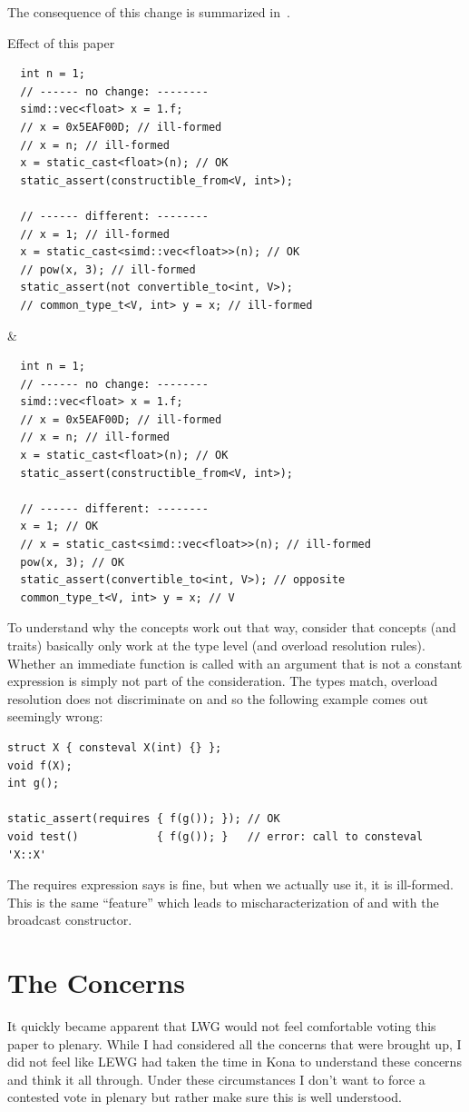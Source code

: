The consequence of this change is summarized in~.
\begin{tonytable}{Effect of this paper}\label{tt:effect}
  \begin{lstlisting}
  int n = 1;
  // ------ no change: --------
  simd::vec<float> x = 1.f;
  // x = 0x5EAF00D; // ill-formed
  // x = n; // ill-formed
  x = static_cast<float>(n); // OK
  static_assert(constructible_from<V, int>);

  // ------ different: --------
  // x = 1; // ill-formed
  x = static_cast<simd::vec<float>>(n); // OK
  // pow(x, 3); // ill-formed
  static_assert(not convertible_to<int, V>);
  // common_type_t<V, int> y = x; // ill-formed
  \end{lstlisting}
  &
  \begin{lstlisting}
  int n = 1;
  // ------ no change: --------
  simd::vec<float> x = 1.f;
  // x = 0x5EAF00D; // ill-formed
  // x = n; // ill-formed
  x = static_cast<float>(n); // OK
  static_assert(constructible_from<V, int>);

  // ------ different: --------
  x = 1; // OK
  // x = static_cast<simd::vec<float>>(n); // ill-formed
  pow(x, 3); // OK
  static_assert(convertible_to<int, V>); // opposite
  common_type_t<V, int> y = x; // V
  \end{lstlisting}
\end{tonytable}%
To understand why the concepts work out that way, consider that concepts (and traits) basically only
work at the type level (and overload resolution rules).
Whether an immediate function is called with an argument that is not a constant expression is simply
not part of the consideration.
The types match, overload resolution does not discriminate on  and so the following
example comes out seemingly wrong:
\medskip\begin{lstlisting}[style=Vc]
struct X { consteval X(int) {} };
void f(X);
int g();

static_assert(requires { f(g()); }); // OK
void test()            { f(g()); }   // error: call to consteval 'X::X'
\end{lstlisting}
The requires expression says  is fine, but when we actually use it, it is ill-formed.
This is the same “feature” which leads to mischaracterization of  and
 with the   broadcast constructor.

\section{The Concerns}
It quickly became apparent that LWG would not feel comfortable voting this paper to plenary.
While I had considered all the concerns that were brought up, I did not feel like LEWG had taken the
time in Kona to understand these concerns and think it all through.
Under these circumstances I don't want to force a contested vote in plenary but rather make sure
this is well understood.

